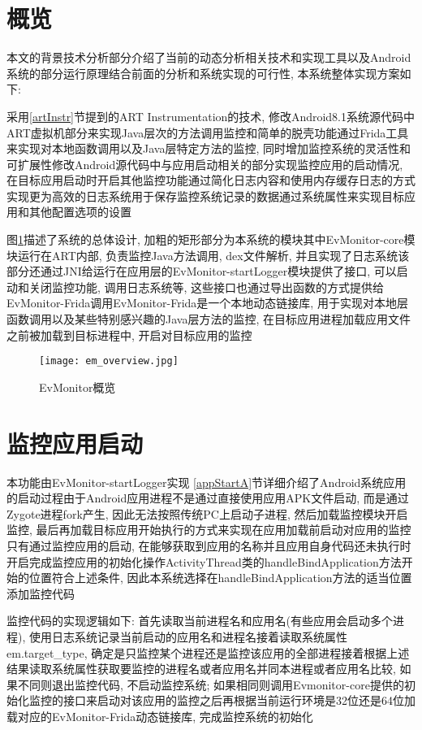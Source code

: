 \section{概览}
本文的背景技术分析部分介绍了当前的动态分析相关技术和实现工具以及Android系统的部分运行原理\juhao 结合前面的分析和系统实现的可行性, 本系统整体实现方案如下:

采用\ref{artInstr}节提到的ART Instrumentation的技术, 修改Android8.1系统源代码中ART虚拟机部分来实现Java层次的方法调用监控和简单的脱壳功能\juhao 通过Frida工具来实现对本地函数调用以及Java层特定方法的监控, 同时增加监控系统的灵活性和可扩展性\juhao 修改Android源代码中与应用启动相关的部分实现监控应用的启动情况, 在目标应用启动时开启其他监控功能\juhao 通过简化日志内容和使用内存缓存日志的方式实现更为高效的日志系统用于保存监控系统记录的数据\juhao 通过系统属性来实现目标应用和其他配置选项的设置\juhao 

图\ref{emOverview}描述了系统的总体设计, 加粗的矩形部分为本系统的模块\juhao 其中EvMonitor-core模块运行在ART内部, 负责监控Java方法调用, dex文件解析, 并且实现了日志系统\juhao 该部分还通过JNI给运行在应用层的EvMonitor-startLogger模块提供了接口, 可以启动和关闭监控功能, 调用日志系统等, 这些接口也通过导出函数的方式提供给EvMonitor-Frida调用\juhao EvMonitor-Frida是一个本地动态链接库, 用于实现对本地层函数调用以及某些特别感兴趣的Java层方法的监控, 在目标应用进程加载应用文件之前被加载到目标进程中, 开启对目标应用的监控\juhao 
\begin{figure}[ht]
	\centering
	\texttt{[image: em\_overview.jpg]}
	\caption{EvMonitor概览}
	\label{emOverview}
\end{figure}

\section{监控应用启动}
本功能由EvMonitor-startLogger实现\juhao 
\ref{appStartA}节详细介绍了Android系统应用的启动过程\juhao 由于Android应用进程不是通过直接使用应用APK文件启动, 而是通过Zygote进程fork产生, 因此无法按照传统PC上启动子进程, 然后加载监控模块开启监控, 最后再加载目标应用开始执行的方式来实现在应用加载前启动对应用的监控\juhao 只有通过监控应用的启动, 在能够获取到应用的名称并且应用自身代码还未执行时开启完成监控应用的初始化操作\juhao ActivityThread类的handleBindApplication方法开始的位置符合上述条件, 因此本系统选择在handleBindApplication方法的适当位置添加监控代码\juhao 

监控代码的实现逻辑如下:
首先读取当前进程名和应用名(有些应用会启动多个进程), 使用日志系统记录当前启动的应用名和进程名\juhao 接着读取系统属性em.target\_type, 确定是只监控某个进程还是监控该应用的全部进程\juhao 接着根据上述结果读取系统属性获取要监控的进程名或者应用名并同本进程或者应用名比较, 如果不同则退出监控代码, 不启动监控系统; 如果相同则调用Evmonitor-core提供的初始化监控的接口来启动对该应用的监控\juhao 之后再根据当前运行环境是32位还是64位加载对应的EvMonitor-Frida动态链接库, 完成监控系统的初始化\juhao 

